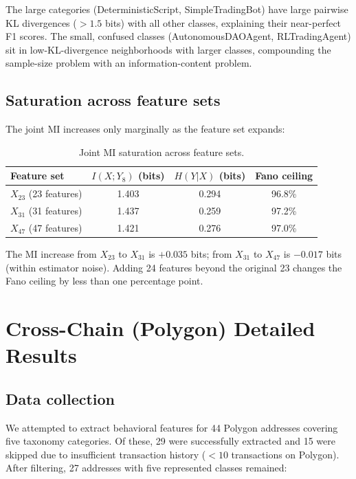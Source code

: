 \documentclass[11pt,a4paper]{article}
\renewcommand{\_}{\oldunderscore\allowbreak}
\begin{document}
The large categories (DeterministicScript, SimpleTradingBot) have
large pairwise KL divergences ($> 1.5$ bits) with all other classes,
explaining their near-perfect F1 scores. The small, confused classes
(AutonomousDAOAgent, RLTradingAgent) sit in low-KL-divergence
neighborhoods with larger classes, compounding the sample-size problem
with an information-content problem.

\subsection{Saturation across feature sets}

The joint MI increases only marginally as the feature set expands:

\begin{table}[h]
\centering
\caption{Joint MI saturation across feature sets.}
\label{tab:mi_saturation}
\begin{tabular}{lccc}
\toprule
\textbf{Feature set} & $I(X; Y_8)$ \textbf{(bits)} & $H(Y|X)$ \textbf{(bits)} & \textbf{Fano ceiling} \\
\midrule
$X_{23}$ (23 features) & 1.403 & 0.294 & 96.8\% \\
$X_{31}$ (31 features) & 1.437 & 0.259 & 97.2\% \\
$X_{47}$ (47 features) & 1.421 & 0.276 & 97.0\% \\
\bottomrule
\end{tabular}
\end{table}

The MI increase from $X_{23}$ to $X_{31}$ is $+0.035$ bits; from
$X_{31}$ to $X_{47}$ is $-0.017$ bits (within estimator noise).
Adding 24 features beyond the original 23 changes the Fano ceiling
by less than one percentage point.

\section{Cross-Chain (Polygon) Detailed Results}
\label{sec:note6}

\subsection{Data collection}

We attempted to extract behavioral features for 44 Polygon addresses
covering five taxonomy categories. Of these, 29 were successfully
extracted and 15 were skipped due to insufficient transaction history
($< 10$ transactions on Polygon). After filtering, 27 addresses with
five represented classes remained:
\end{document}
